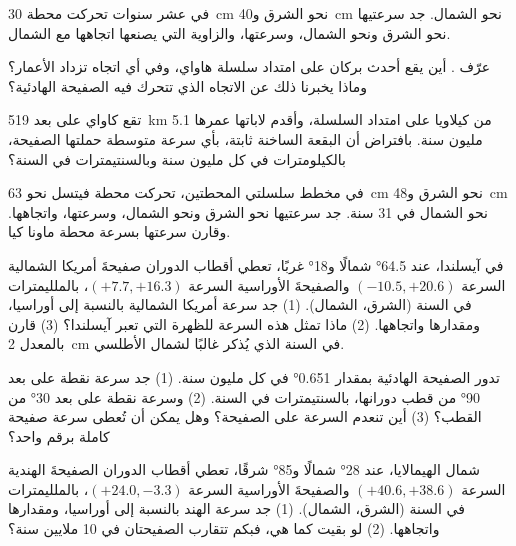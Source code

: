 \begin{exercise}[$\star$]\label{exo:g11:plate-motions:3}
في عشر سنوات تحركت محطة \qty{30}{cm} نحو الشرق و\qty{40}{cm} نحو الشمال. جد
سرعتيها نحو الشرق ونحو الشمال، وسرعتها، والزاوية التي يصنعها اتجاهها مع
الشمال.
\end{exercise}

\begin{exercise}[$\star$]\label{exo:g11:plate-motions:4}
عرّف . أين يقع أحدث بركان على امتداد سلسلة هاواي،
وفي أي اتجاه تزداد الأعمار؟ وماذا يخبرنا ذلك
عن الاتجاه الذي تتحرك فيه الصفيحة الهادئية؟
\end{exercise}

\begin{exercise}[$\star$]\label{exo:g11:plate-motions:5}
تقع كاواي على بعد \qty{519}{km} من كيلاويا على امتداد السلسلة، وأقدم لاباتها
عمرها \num{5.1} مليون سنة. بافتراض أن البقعة الساخنة ثابتة، بأي
سرعة متوسطة حملتها الصفيحة، بالكيلومترات في كل مليون سنة
وبالسنتيمترات في السنة؟
\end{exercise}

\begin{exercise}[$\star\star$]\label{exo:g11:plate-motions:6}
في مخطط سلسلتي المحطتين، تحركت محطة فيتسل نحو
\qty{63}{cm} نحو الشرق و\qty{48}{cm} نحو الشمال في 31 سنة. جد سرعتيها نحو الشرق ونحو الشمال،
وسرعتها، واتجاهها. وقارن سرعتها بسرعة محطة ماونا
كيا.
\end{exercise}

\begin{exercise}[$\star\star$]\label{exo:g11:plate-motions:7}
في آيسلندا، عند \ang{64.5} شمالًا و\ang{18} غربًا، تعطي أقطاب الدوران
صفيحةَ أمريكا الشمالية السرعة $(-10.5, +20.6)$ والصفيحةَ الأوراسية
السرعة $(+7.7, +16.3)$، بالملليمترات في السنة (الشرق، الشمال). (1) جد
سرعة أمريكا الشمالية بالنسبة إلى أوراسيا، ومقدارها واتجاهها.
(2) ماذا تمثل هذه السرعة للظهرة التي تعبر آيسلندا؟ (3) قارن
بالمعدل \qty{2}{cm} في السنة الذي يُذكر غالبًا لشمال الأطلسي.
\end{exercise}

\begin{exercise}[$\star\star$]\label{exo:g11:plate-motions:8}
تدور الصفيحة الهادئية بمقدار \ang{0.651} في كل مليون سنة. (1) جد سرعة
نقطة على بعد \ang{90} من قطب دورانها، بالسنتيمترات في السنة. (2) وسرعة
نقطة على بعد \ang{30} من القطب؟ (3) أين تنعدم السرعة على الصفيحة؟ وهل يمكن
أن تُعطى سرعة صفيحة كاملة برقم واحد؟
\end{exercise}

\begin{exercise}[$\star\star$]\label{exo:g11:plate-motions:9}
شمال الهيمالايا، عند \ang{28} شمالًا و\ang{85} شرقًا، تعطي أقطاب الدوران
الصفيحةَ الهندية السرعة $(+40.6, +38.6)$ والصفيحةَ الأوراسية
السرعة $(+24.0, -3.3)$، بالملليمترات في السنة (الشرق، الشمال). (1) جد سرعة
الهند بالنسبة إلى أوراسيا، ومقدارها واتجاهها. (2) لو بقيت
كما هي، فبكم تتقارب الصفيحتان في 10 ملايين سنة؟
\end{exercise}

